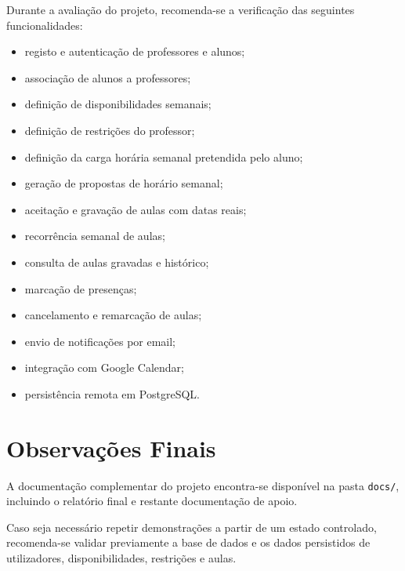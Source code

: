 \documentclass[]{article}
\begin{document}
    Durante a avaliação do projeto, recomenda-se a verificação das seguintes funcionalidades:

    \begin{itemize}
        \item registo e autenticação de professores e alunos;
        \item associação de alunos a professores;
        \item definição de disponibilidades semanais;
        \item definição de restrições do professor;
        \item definição da carga horária semanal pretendida pelo aluno;
        \item geração de propostas de horário semanal;
        \item aceitação e gravação de aulas com datas reais;
        \item recorrência semanal de aulas;
        \item consulta de aulas gravadas e histórico;
        \item marcação de presenças;
        \item cancelamento e remarcação de aulas;
        \item envio de notificações por email;
        \item integração com Google Calendar;
        \item persistência remota em PostgreSQL.
    \end{itemize}

    \section{Observações Finais}

    A documentação complementar do projeto encontra-se disponível na pasta \texttt{docs/}, incluindo o relatório final e restante documentação de apoio.

    Caso seja necessário repetir demonstrações a partir de um estado controlado, recomenda-se validar previamente a base de dados e os dados persistidos de utilizadores, disponibilidades, restrições e aulas.
\end{document}
